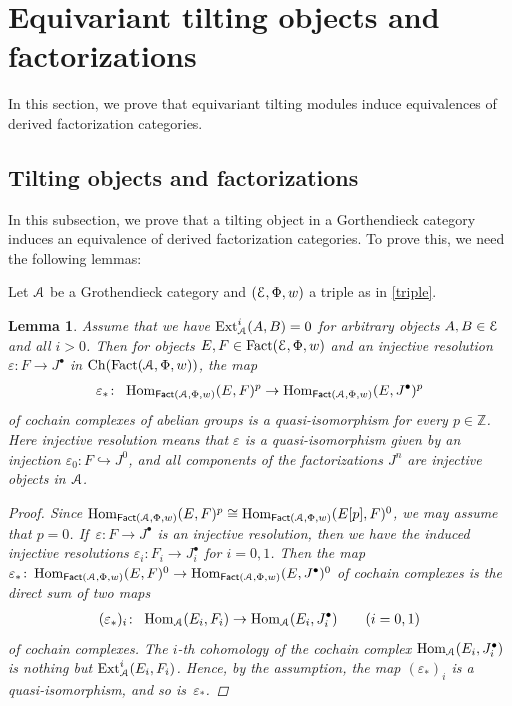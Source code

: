 \documentclass[11pt]{article}
\numberwithin{equation}{section}
\newtheorem{lem}[dfn]{Lemma}
\numberwithin{equation}{section}
\newcommand{\Ch}{\operatorname{Ch}}
\newcommand{\Fact}{\operatorname{Fact}}
\newcommand{\dgFact}{\operatorname{\sf{Fact}}}
\newcommand{\Hom}{\operatorname{Hom}}
\newcommand{\Ext}{\operatorname{Ext}}
\newcommand{\bZ}{\mathbb{Z}}
\newcommand{\scrA}{\EuScript{A}}
\newcommand{\scrE}{\EuScript{E}}
\newcommand{\hookto}{\hookrightarrow}
\begin{document}
\section{Equivariant tilting objects and factorizations}

In this section, we prove that equivariant tilting modules induce equivalences of derived factorization categories.

\subsection{Tilting objects and factorizations}\label{general morita}
In this subsection, we prove that a tilting object in a Gorthendieck category induces an equivalence of derived factorization categories. To prove this, we need the following lemmas:


Let $\scrA$ be a Grothendieck category and $(\scrE,\Phi,w)$ a triple as in \eqref{triple}.
\begin{lem}\label{qis}
Assume that we have $\Ext^i_{\scrA}(A,B)=0$ for arbitrary objects $A,B\in \scrE$ and all $i>0$. Then for objects $E,F\in \Fact(\scrE,\Phi,w)$ and an injective resolution $\varepsilon\colon F\to J^{\bullet}$ in $\Ch(\Fact(\scrA,\Phi,w))$, the map
\begin{gather*}
\varepsilon_*\colon\ \Hom_{\dgFact(\scrA,\Phi,w)}(E,F)^p\to\Hom_{\dgFact(\scrA,\Phi,w)}(E,J^{\bullet})^p
\end{gather*}
of cochain complexes of abelian groups is a quasi-isomorphism for every $p\in \bZ$. Here injective resolution means that $\varepsilon$ is a quasi-isomorphism given by an injection $\varepsilon_0\colon F\hookto J^0$, and all components of the factorizations $J^n$ are injective objects in $\scrA$.

\begin{proof}
Since $\Hom_{\dgFact(\scrA,\Phi,w)}(E,F)^p\cong \Hom_{\dgFact(\scrA,\Phi,w)}(E[p],F)^0$, we may assume that $p=0$. If~$\varepsilon\colon F\to J^{\bullet}$ is an injective resolution, then we have the induced injective resolutions $\varepsilon_i\colon F_i\to J^{\bullet}_i$ for $i=0,1$.
Then the map $\varepsilon_*\colon \Hom_{\dgFact(\scrA,\Phi,w)}(E,F)^0\to\Hom_{\dgFact(\scrA,\Phi,w)}(E,J^{\bullet})^0$ of cochain complexes is the direct sum of two maps
\begin{gather*}
(\varepsilon_*)_i\colon\ \Hom_{\scrA}(E_i,F_i)\to \Hom_{\scrA}(E_i,J^{\bullet}_i)\qquad (i=0,1)
\end{gather*}
of cochain complexes. The $i$-th cohomology of the cochain complex $\Hom_{\scrA}(E_i,J^{\bullet}_i)$ is nothing but $\Ext^i_{\scrA}(E_i,F_i)$. Hence, by the assumption, the map $(\varepsilon_*)_i$ is a quasi-isomorphism, and so is~$\varepsilon_*$.
\end{proof}
\end{lem}
\end{document}
